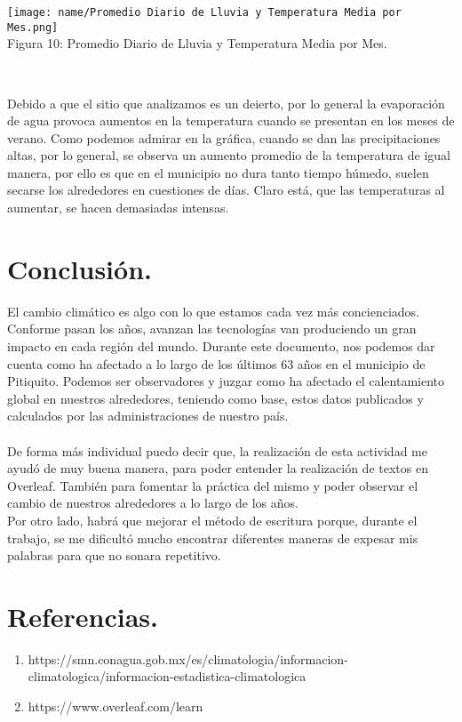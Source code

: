 \documentclass{article}
\begin{document}
\begin{center}
    \texttt{[image: name/Promedio Diario de Lluvia y Temperatura Media por Mes.png]}\\
    \caption{\small Figura 10: Promedio Diario de Lluvia y Temperatura Media por Mes.}\\
\end{center}
Debido a que el sitio que analizamos es un deierto, por lo general la evaporación de agua provoca aumentos en la temperatura cuando se presentan en los meses de verano. Como podemos admirar en la gráfica, cuando se dan las precipitaciones altas, por lo general, se observa un aumento promedio de la temperatura de igual manera, por ello es que en el municipio no dura tanto tiempo húmedo, suelen secarse los alrededores en cuestiones de días. Claro está, que las temperaturas al aumentar, se hacen demasiadas intensas. 
\maketitle
\section{Conclusión.}
El cambio climático es algo con lo que estamos cada vez más concienciados. Conforme pasan los años, avanzan las tecnologías van produciendo un gran impacto en cada región del mundo. Durante este documento, nos podemos dar cuenta como ha afectado a lo largo de los últimos 63 años en el municipio de Pitiquito. Podemos ser observadores y juzgar como ha afectado el calentamiento global en nuestros alrededores, teniendo como base, estos datos publicados y calculados por las administraciones de nuestro país.\\\\De forma más individual puedo decir que, la realización de esta actividad me ayudó de muy buena manera, para poder entender la realización de textos en Overleaf. También para fomentar la práctica del mismo y poder observar el cambio de nuestros alrededores a lo largo de los años.\\Por otro lado, habrá que mejorar el método de escritura porque, durante el trabajo, se me dificultó mucho encontrar diferentes maneras de expesar mis palabras para que no sonara repetitivo.
\maketitle
\section{Referencias.}
\begin{enumerate}
    \item https://smn.conagua.gob.mx/es/climatologia/informacion-climatologica/informacion-estadistica-climatologica
    \item https://www.overleaf.com/learn
\end{enumerate}
\end{document}
